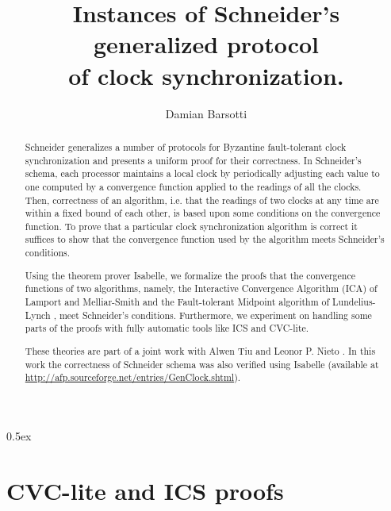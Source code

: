 \documentclass[11pt,a4paper]{article}
\begin{document}
\title{Instances of Schneider's generalized protocol\\
       of clock synchronization.}

\author{Damian Barsotti}
\maketitle

\begin{abstract}\noindent  
  Schneider \cite{schneider87understanding} generalizes a number of
  protocols for Byzantine fault-tolerant clock synchronization and
  presents a uniform proof for their correctness. In Schneider's
  schema, each processor maintains a local clock by periodically
  adjusting each value to one computed by a convergence function
  applied to the readings of all the clocks. Then, correctness of an
  algorithm, i.e. that the readings of two clocks at any time are
  within a fixed bound of each other, is based upon some conditions on
  the convergence function. To prove that a particular clock
  synchronization algorithm is correct it suffices to show that the
  convergence function used by the algorithm meets Schneider's
  conditions.

  Using the theorem prover Isabelle, we formalize the proofs that the
  convergence functions of two algorithms, namely, the Interactive
  Convergence Algorithm (ICA) of Lamport and Melliar-Smith
  \cite{lamport_cs} and the Fault-tolerant Midpoint algorithm of
  Lundelius-Lynch \cite{lynch_cs}, meet Schneider's conditions.
  Furthermore, we experiment on handling some parts of the proofs with
  fully automatic tools like ICS\cite{ics} and \mbox{CVC-lite}\cite{cvclite}.

  These theories are part of a joint work with Alwen Tiu and Leonor
  P. Nieto \cite{bars_leon_tiu}. In this work the correctness of
  Schneider schema was also verified using Isabelle (available at
  \url{http://afp.sourceforge.net/entries/GenClock.shtml}).

\end{abstract}

\tableofcontents

\parindent 0pt\parskip 0.5ex



\appendix

\section{CVC-lite and ICS proofs}
\end{document}
